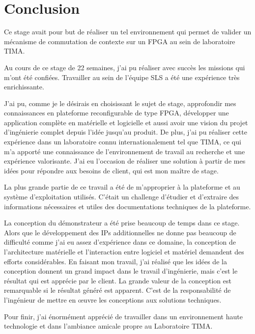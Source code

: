 \chapter{Conclusion}

Ce stage avait pour but de réaliser un tel environnement qui permet de valider un mécanisme de
commutation de contexte sur un FPGA au sein de laboratoire TIMA.

Au cours de ce stage de 22 semaines, j’ai pu réaliser avec succès les missions qui m’ont été confiées.
Travailler au sein de l’équipe SLS a été une expérience très enrichissante. 

J’ai pu, comme je le désirais en choisissant le sujet de stage, approfondir mes connaissances 
en plateforme reconfigurable de type FPGA, développer une application complète en matérielle et logicielle
et aussi avoir une vision du projet d'ingénierie complet depuis l'idée jusqu'au produit.
De plus, j'ai pu réaliser cette expérience dans un laboratoire connu internationalement tel que TIMA, ce qui
m'a apporté une connaissance de l'environnement de travail au recherche et une expérience valorisante.
J'ai eu l'occasion de réaliser une solution à partir de mes idées pour répondre aux besoins de client,
qui est mon maître de stage.

La plus grande partie de ce travail a été de m'approprier à la plateforme et au système d'exploitation utilisés.
C'était un challenge d'étudier et d'extraire des informations nécessaires et utiles des documentations techniques
de la plateforme.

La conception du démonstrateur a été prise beaucoup de temps dans ce stage. Alors que le développement
des IPs additionnelles ne donne pas beaucoup de difficulté comme j'ai eu assez d'expérience dans ce domaine, la conception
de l'architecture matérielle et l'interaction entre logiciel et matériel demandent des efforts considérables.
En faisant mon travail, j'ai réalisé que les idées de la conception donnent un grand impact dans le travail
d'ingénierie, mais c'est le résultat qui est apprécie par le client. La grande valeur de la conception est
remarquable si le résultat généré est apparent.
C'est de la responsabilité de l'ingénieur de mettre en œuvre les conceptions aux solutions techniques.

Pour finir, j’ai énormément apprécié de travailler dans un environnement haute technologie et dans l’ambiance amicale propre au Laboratoire TIMA.